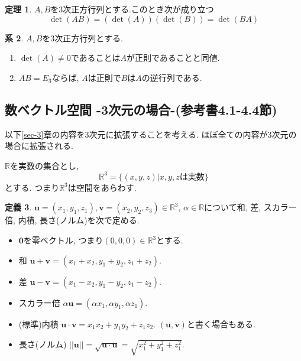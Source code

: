 \documentclass[dvipdfmx,a4paper,11pt]{article}
\newcommand{\R}{\mathbb{R}}
\theoremstyle{definition}
\newtheorem{thm}{定理}
\newtheorem{cor}[thm]{系}
\newtheorem{dfn}[thm]{定義}
\begin{document}
\begin{tcolorbox}[
    colback = white,
    colframe = green!35!black,
    fonttitle = \bfseries,
    breakable = true]
    \begin{thm}
   \label{determinant}
$A,B$を3次正方行列とする.このとき次が成り立つ
$$\det(AB)=(\det(A))(\det(B)) = \det(BA)$$
  \end{thm}
 \end{tcolorbox}
 


\begin{tcolorbox}[
    colback = white,
    colframe = green!35!black,
    fonttitle = \bfseries,
    breakable = true]
    \begin{cor}
   \label{determinant}
$A,B$を3次正方行列とする.
\begin{enumerate}
	\setlength{\parskip}{0cm}
  	\setlength{\itemsep}{0pt} 
\item $\det(A) \neq 0$であることは$A$が正則であることと同値.
\item $AB=E_3$ならば, $A$は正則で$B$は$A$の逆行列である. 
\end{enumerate}
  \end{cor}
 \end{tcolorbox}


\subsection{数ベクトル空間 -3次元の場合-(参考書4.1-4.4節)}
以下\ref{sec-3}章の内容を3次元に拡張することを考える. 
ほぼ全ての内容が3次元の場合に拡張される. 

$\R$を実数の集合とし, 
$$
\R^3  = \{ (x, y,z) | \text{$x,y,z$は実数}\} 
$$
とする. 
つまり$\R^3$は空間をあらわす.


\begin{tcolorbox}[
    colback = white,
    colframe = green!35!black,
    fonttitle = \bfseries,
    breakable = true]
    \begin{dfn}
$\bm{u}=(x_1, y_1, z_1), \bm{v}=(x_2, y_2, z_3)\in \R^3$, $\alpha \in \R$について和, 差, スカラー倍, 内積, 長さ(ノルム)を次で定める.
\begin{itemize}
	\setlength{\parskip}{0cm}
  	\setlength{\itemsep}{0pt} 
\item $\bm{0}$を零ベクトル, つまり$(0,0,0) \in \R^3$とする.
\item 和 $\bm{u} + \bm{v} = (x_1 + x_2, y_1+ y_2, z_1 + z_2)$.
\item 差 $\bm{u} - \bm{v} = (x_1 - x_2, y_1 - y_2, z_1 - z_2)$.
\item スカラー倍 $\alpha \bm{u} = (\alpha x_1, \alpha y_1, \alpha z_1)$.
\item (標準)内積 $\bm{u} \cdot\bm{v} = x_1 x_2 +  y_1 y_2+ z_1z_2 $. $(\bm{u}, \bm{v})$と書く場合もある. 
\item 長さ(ノルム) $||\bm{u}||= \sqrt{\bm{u} \cdot\bm{u}} = \sqrt{x_{1}^2 +  y_{1}^{2} +  z_{1}^{2} }$.
\end{itemize}
    \end{dfn}
 \end{tcolorbox}
\end{document}
